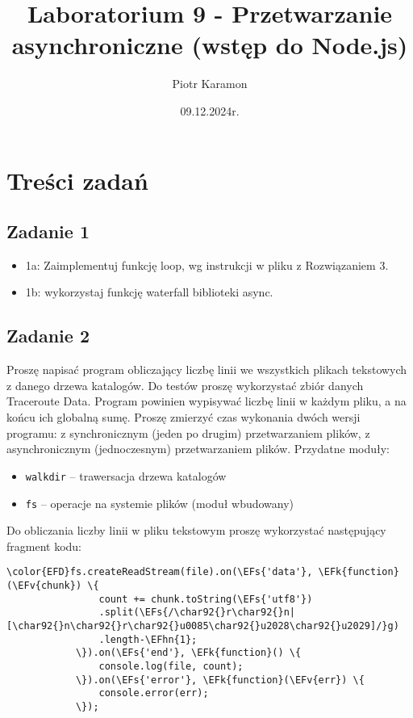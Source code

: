 \documentclass[11pt]{article}
\author{Piotr Karamon}
\date{09.12.2024r.}
\title{Laboratorium 9 - Przetwarzanie asynchroniczne (wstęp do Node.js)}
\newcommand{\EFs}[1]{\textcolor{EFs}{#1}} %
\newcommand{\EFk}[1]{\textcolor{EFk}{#1}} %
\newcommand{\EFv}[1]{\textcolor{EFv}{#1}} %
\newcommand{\EFhn}[1]{\textcolor{EFhn}{#1}} %
\begin{document}
\maketitle
\section*{Treści zadań}
\label{sec:org1f6ae23}
\subsection*{Zadanie 1}
\label{sec:orgf6f3bcb}
\begin{itemize}
\item 1a: Zaimplementuj funkcję loop, wg instrukcji w pliku z Rozwiązaniem 3.
\item 1b: wykorzystaj funkcję waterfall biblioteki async.
\end{itemize}
\subsection*{Zadanie 2}
\label{sec:org4f67c76}
Proszę napisać program obliczający liczbę linii we wszystkich plikach tekstowych
z danego drzewa katalogów. Do testów proszę wykorzystać zbiór danych Traceroute
Data. Program powinien wypisywać liczbę linii w każdym pliku, a na końcu ich
globalną sumę. Proszę zmierzyć czas wykonania dwóch wersji programu: z
synchronicznym (jeden po drugim) przetwarzaniem plików, z asynchronicznym
(jednoczesnym) przetwarzaniem plików.
Przydatne moduły:
\begin{itemize}
\item \texttt{walkdir} -- trawersacja drzewa katalogów
\item \texttt{fs} -- operacje na systemie plików (moduł wbudowany)
\end{itemize}

Do obliczania liczby linii w pliku tekstowym proszę wykorzystać następujący fragment kodu:
\begin{Code}
\begin{Verbatim}
\color{EFD}fs.createReadStream(file).on(\EFs{'data'}, \EFk{function}(\EFv{chunk}) \{
                count += chunk.toString(\EFs{'utf8'})
                .split(\EFs{/\char92{}r\char92{}n|[\char92{}n\char92{}r\char92{}u0085\char92{}u2028\char92{}u2029]/}g)
                .length-\EFhn{1};
            \}).on(\EFs{'end'}, \EFk{function}() \{
                console.log(file, count);
            \}).on(\EFs{'error'}, \EFk{function}(\EFv{err}) \{
                console.error(err);
            \});
\end{Verbatim}
\end{Code}
\end{document}
